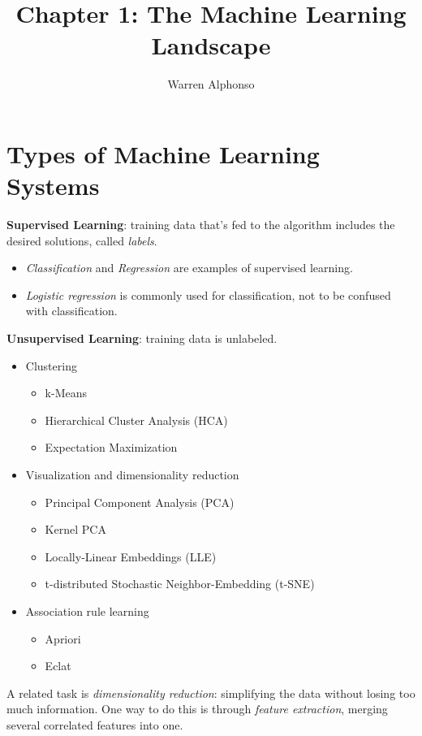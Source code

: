 \documentclass[11pt, a4paper]{article}
\author{Warren Alphonso}
\title{Chapter 1: The Machine Learning Landscape}
\begin{document}
\maketitle
\tableofcontents
\section{Types of Machine Learning Systems}

\noindent
\textbf{Supervised Learning}: training data that's fed to the algorithm includes the desired solutions, called \textsl{labels}.
\begin{itemize}
\item \textsl{Classification} and \textsl{Regression} are examples of supervised learning.
\item \textsl{Logistic regression} is commonly used for classification, not to be confused with classification. 
\end{itemize}

\noindent
\textbf{Unsupervised Learning}: training data is unlabeled.
\begin{itemize}
	\item Clustering 
	\begin{itemize}
		\item k-Means
		\item Hierarchical Cluster Analysis (HCA)
		\item Expectation Maximization 
	\end{itemize}

	\item Visualization and dimensionality reduction
	\begin{itemize}
		\item Principal Component Analysis (PCA)
		\item Kernel PCA 
		\item Locally-Linear Embeddings (LLE)
		\item t-distributed Stochastic Neighbor-Embedding (t-SNE)
	\end{itemize}

	\item Association rule learning 
	\begin{itemize}
		\item Apriori 
		\item Eclat
	\end{itemize}
\end{itemize}

A related task is \textsl{dimensionality reduction}: simplifying the data without losing too much information. One way to do this is through \textsl{feature extraction}, merging several correlated features into one. \\
\end{document}
